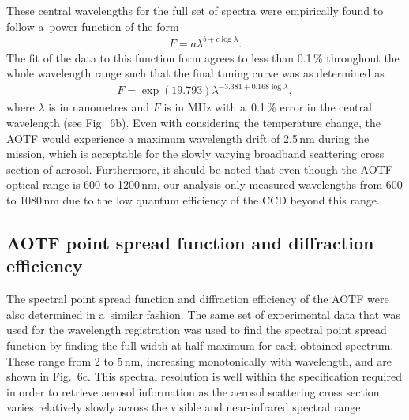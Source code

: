 \documentclass[amt]{copernicus}
\begin{document}
These central wavelengths for the full set of spectra were empirically
found to follow a~power function of the form
\begin{align}
F=a\lambda^{b+c\log \lambda}.
\end{align}
The fit of the data to this function form agrees to less than
0.1\,{\%} throughout the whole wavelength range such that the final
tuning curve was as determined as
\begin{align}
F=\exp \left(19.793 \right)\lambda^{-3.381+0.168\log \lambda},
\end{align}
where $\lambda$ is in nanometres and $F$ is in MHz with a~0.1\,{\%}
error in the central wavelength (see Fig.~6b). Even with considering the temperature change, the AOTF
would experience a maximum wavelength drift of 2.5\,nm during the mission, which is
acceptable for the slowly varying broadband scattering cross section of aerosol. Furthermore, it should be noted that
even though the AOTF optical range is 600 to 1200\,\unit{nm}, our
analysis only measured wavelengths from 600 to 1080\,\unit{nm} due to
the low quantum efficiency of the CCD beyond this range.

\subsection{AOTF point spread function and diffraction efficiency}

The spectral point spread function and diffraction efficiency of the
AOTF were also determined in a~similar fashion. The same set of
experimental data that was used for the wavelength registration was
used to find the spectral point spread function by finding the full
width at half maximum for each obtained spectrum. These range from
2 to 5\,\unit{nm}, increasing monotonically with wavelength, and are
shown in Fig.~6c. This spectral resolution is well within the
specification required in order to retrieve aerosol information as the
aerosol scattering cross section varies relatively slowly across the visible
and near-infrared spectral range.
\end{document}
